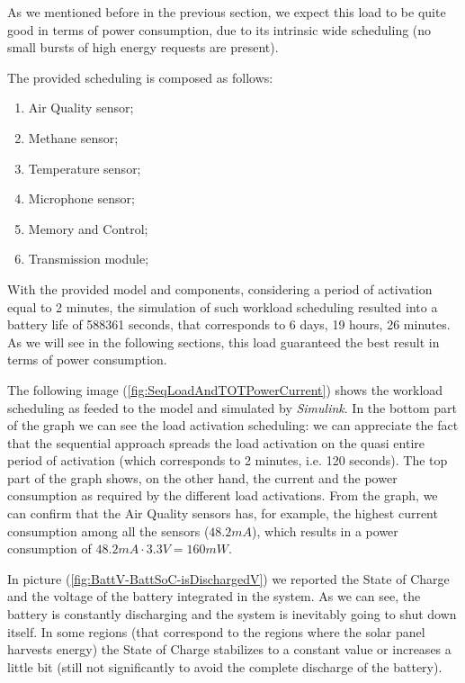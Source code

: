 \documentclass[a4paper]{article}
\begin{document}
        As we mentioned before in the previous section, we expect this load to be quite good in terms of power consumption, due to its intrinsic wide scheduling (no small bursts of high energy requests are present).

        The provided scheduling is composed as follows:
        \begin{enumerate}
            \item Air Quality sensor;
            \item Methane sensor;
            \item Temperature sensor;
            \item Microphone sensor;
            \item Memory and Control;
            \item Transmission module;
        \end{enumerate}

        With the provided model and components, considering a period of activation equal to 2 minutes, the simulation of such workload scheduling resulted into a battery life of 588361 seconds, that corresponds to 6 days, 19 hours, 26 minutes. As we will see in the following sections, this load guaranteed the best result in terms of power consumption.

        The following image (\ref{fig:SeqLoadAndTOTPowerCurrent}) shows the workload scheduling as feeded to the model and simulated by \emph{Simulink}. In the bottom part of the graph we can see the load activation scheduling: we can appreciate the fact that the sequential approach spreads the load activation on the quasi entire period of activation (which corresponds to 2 minutes, i.e. 120 seconds). The top part of the graph shows, on the other hand, the current and the power consumption as required by the different load activations. From the graph, we can confirm that the Air Quality sensors has, for example, the highest current consumption among all the sensors ($48.2 mA$), which results in a power consumption of $48.2 mA \cdot 3.3V = 160mW$.

        In picture (\ref{fig:BattV-BattSoC-isDischargedV}) we reported the State of Charge and the voltage of the battery integrated in the system. As we can see, the battery is constantly discharging and the system is inevitably going to shut down itself. In some regions (that correspond to the regions where the solar panel harvests energy) the State of Charge stabilizes to a constant value or increases a little bit (still not significantly to avoid the complete discharge of the battery).
\end{document}
